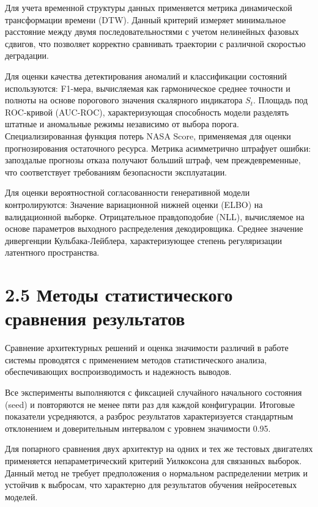 \documentclass[14pt, a4paper, oneside]{extreport}
\begin{document}
Для учета временной структуры данных применяется метрика динамической трансформации времени (DTW). Данный критерий измеряет минимальное расстояние между двумя последовательностями с учетом нелинейных фазовых сдвигов, что позволяет корректно сравнивать траектории с различной скоростью деградации.

Для оценки качества детектирования аномалий и классификации состояний используются:
F1-мера, вычисляемая как гармоническое среднее точности и полноты на основе порогового значения скалярного индикатора $S_t$.
Площадь под ROC-кривой (AUC-ROC), характеризующая способность модели разделять штатные и аномальные режимы независимо от выбора порога.
Специализированная функция потерь NASA Score, применяемая для оценки прогнозирования остаточного ресурса. Метрика асимметрично штрафует ошибки: запоздалые прогнозы отказа получают больший штраф, чем преждевременные, что соответствует требованиям безопасности эксплуатации.

Для оценки вероятностной согласованности генеративной модели контролируются:
Значение вариационной нижней оценки (ELBO) на валидационной выборке.
Отрицательное правдоподобие (NLL), вычисляемое на основе параметров выходного распределения декодировщика.
Среднее значение дивергенции Кульбака-Лейблера, характеризующее степень регуляризации латентного пространства.


\vspace{1em}
\section{2.5 Методы статистического сравнения результатов}
\vspace{1em}

Сравнение архитектурных решений и оценка значимости различий в работе системы проводятся с применением методов статистического анализа, обеспечивающих воспроизводимость и надежность выводов.

Все эксперименты выполняются с фиксацией случайного начального состояния (seed) и повторяются не менее пяти раз для каждой конфигурации. Итоговые показатели усредняются, а разброс результатов характеризуется стандартным отклонением и доверительным интервалом с уровнем значимости 0.95.

Для попарного сравнения двух архитектур на одних и тех же тестовых двигателях применяется непараметрический критерий Уилкоксона для связанных выборок. Данный метод не требует предположения о нормальном распределении метрик и устойчив к выбросам, что характерно для результатов обучения нейросетевых моделей.
\end{document}
